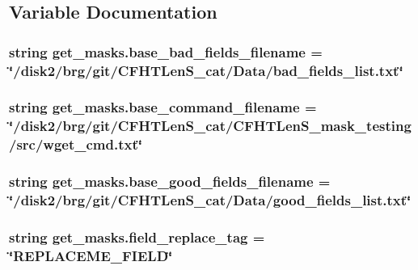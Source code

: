 \subsection{Variable Documentation}
\hypertarget{namespaceget__masks_a2381f56dab6f54df7ec5b9524efed2b5}{
\subsubsection[{base\-\_\-bad\-\_\-fields\-\_\-filename}]{\setlength{\rightskip}{0pt plus 5cm}string get\-\_\-masks.\-base\-\_\-bad\-\_\-fields\-\_\-filename = \char`\"{}/disk2/brg/git/C\-F\-H\-T\-Len\-S\-\_\-cat/Data/bad\-\_\-fields\-\_\-list.\-txt\char`\"{}}}\label{namespaceget__masks_a2381f56dab6f54df7ec5b9524efed2b5}
\hypertarget{namespaceget__masks_a42c3003d294025981e1d3563c771c11a}{
\subsubsection[{base\-\_\-command\-\_\-filename}]{\setlength{\rightskip}{0pt plus 5cm}string get\-\_\-masks.\-base\-\_\-command\-\_\-filename = \char`\"{}/disk2/brg/git/C\-F\-H\-T\-Len\-S\-\_\-cat/C\-F\-H\-T\-Len\-S\-\_\-mask\-\_\-testing/src/wget\-\_\-cmd.\-txt\char`\"{}}}\label{namespaceget__masks_a42c3003d294025981e1d3563c771c11a}
\hypertarget{namespaceget__masks_abe60bb87ec8734a7d355ce3cde50e686}{
\subsubsection[{base\-\_\-good\-\_\-fields\-\_\-filename}]{\setlength{\rightskip}{0pt plus 5cm}string get\-\_\-masks.\-base\-\_\-good\-\_\-fields\-\_\-filename = \char`\"{}/disk2/brg/git/C\-F\-H\-T\-Len\-S\-\_\-cat/Data/good\-\_\-fields\-\_\-list.\-txt\char`\"{}}}\label{namespaceget__masks_abe60bb87ec8734a7d355ce3cde50e686}
\hypertarget{namespaceget__masks_ad7d01a44c76fbc862e6a10375d78c260}{
\subsubsection[{field\-\_\-replace\-\_\-tag}]{\setlength{\rightskip}{0pt plus 5cm}string get\-\_\-masks.\-field\-\_\-replace\-\_\-tag = \char`\"{}R\-E\-P\-L\-A\-C\-E\-M\-E\-\_\-\-F\-I\-E\-L\-D\char`\"{}}}\label{namespaceget__masks_ad7d01a44c76fbc862e6a10375d78c260}
